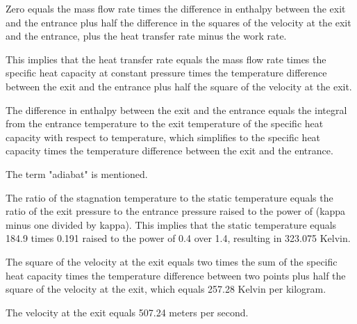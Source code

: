 Zero equals the mass flow rate times the difference in enthalpy between the exit and the entrance plus half the difference in the squares of the velocity at the exit and the entrance, plus the heat transfer rate minus the work rate.

This implies that the heat transfer rate equals the mass flow rate times the specific heat capacity at constant pressure times the temperature difference between the exit and the entrance plus half the square of the velocity at the exit.

The difference in enthalpy between the exit and the entrance equals the integral from the entrance temperature to the exit temperature of the specific heat capacity with respect to temperature, which simplifies to the specific heat capacity times the temperature difference between the exit and the entrance.

The term "adiabat" is mentioned.

The ratio of the stagnation temperature to the static temperature equals the ratio of the exit pressure to the entrance pressure raised to the power of (kappa minus one divided by kappa). This implies that the static temperature equals 184.9 times 0.191 raised to the power of 0.4 over 1.4, resulting in 323.075 Kelvin.

The square of the velocity at the exit equals two times the sum of the specific heat capacity times the temperature difference between two points plus half the square of the velocity at the exit, which equals 257.28 Kelvin per kilogram.

The velocity at the exit equals 507.24 meters per second.